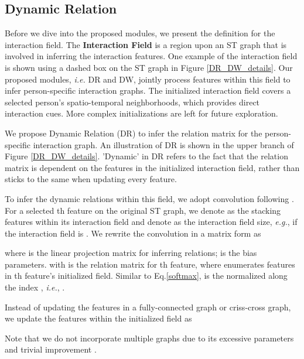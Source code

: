 \documentclass[10pt,twocolumn,letterpaper]{article}
\begin{document}
\subsection{Dynamic Relation} \label{DR}


Before we dive into the proposed modules, we present the definition for the interaction field. The \textbf{Interaction Field} is a region upon an ST graph that is involved in inferring the interaction features. One example of the interaction field is shown using a dashed box on the ST graph in Figure \ref{DR_DW_details}. Our proposed modules, \textit{i.e.} DR and DW, jointly process features within this field to infer person-specific interaction graphs. The initialized interaction field covers a selected person's spatio-temporal neighborhoods, which provides direct interaction cues. More complex initializations are left for future exploration.


We propose Dynamic Relation (DR) to infer the relation matrix for the person-specific interaction graph. An illustration of DR is shown in the upper branch of Figure \ref{DR_DW_details}. 'Dynamic' in DR refers to the fact that the relation matrix is dependent on the features in the initialized interaction field, rather than sticks to the same when updating every feature.

To infer the dynamic relations within this field, we adopt convolution following \cite{dai2017dcnv1,zhang2020DGMN}. For a selected th feature on the original ST graph, we denote  as the stacking features within its interaction field and denote  as the interaction field size, \textit{e.g.},  if the interaction field is . We rewrite the convolution in a matrix form as

where  is the linear projection matrix for inferring relations;  is the bias parameters.  with  is the relation matrix for th feature, where  enumerates  features in th feature's initialized field. Similar to Eq.\ref{softmax},  is the normalized  along the index , \textit{i.e.}, .



Instead of updating the features in a fully-connected graph or criss-cross graph, we update the features within the initialized field as

Note that we do not incorporate multiple graphs due to its excessive parameters and trivial improvement \cite{wu2019learning}. 
\end{document}
